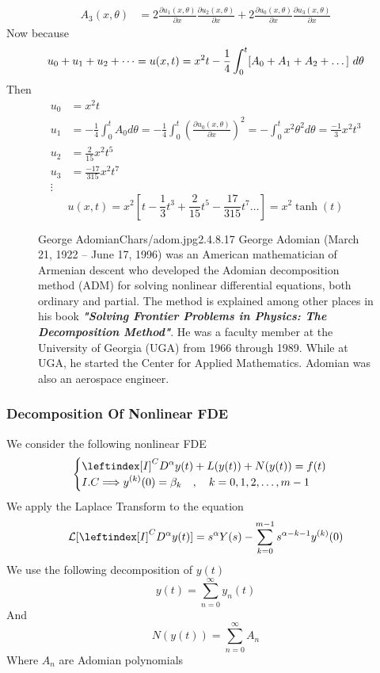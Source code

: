 \begin{example}
\begin{align*}
        A_3(x,\theta) & = 2\frac{\partial u_1(x,\theta)}{\partial x}\frac{\partial u_2(x,\theta)}{\partial x} + 2\frac{\partial u_0(x,\theta)}{\partial x} \frac{\partial u_3(x,\theta)}{\partial x}
    \end{align*}
    Now because
    \[
        u_0 + u_1 + u_2 + \dots = u(x,t) = x^2t - \frac{1}{4}\int_{0}^{t}[A_0+A_1+A_2+\dots] \,\, d\theta
    \]
    Then
    \begin{align*}
        u_0 & = x^2t
        \\
        u_1 & = -\frac{1}{4}\int_{0}^{t}A_0d\theta = -\frac{1}{4}\int_{0}^{t}\left(\frac{\partial u_0(x,\theta)}{\partial x}\right)^2 = -\int_{0}^{t} x^2 \theta^2 d\theta = \frac{-1}{3}x^2t^3
        \\
        u_2 & = \frac{2}{15} x^2t^5
        \\
        u_3 &= \frac{-17}{315} x^2t^7 
        \\
        \vdots
    \end{align*}
    \[
        u(x,t) = x^2 \left[t-\frac{1}{3}t^3 + \frac{2}{15} t^5 - \frac{17}{315} t^7 \dots\right] = x^2 \tanh(t)
    \]
\end{example}
\begin{figure}[b]
    \begin{enrichment}{George Adomian}{Chars/adom.jpg}{2.4}{.8}{.17}
        George Adomian (March 21, 1922 – June 17, 1996)
        was an American mathematician of Armenian descent
        who developed the Adomian decomposition method (ADM)
        for solving nonlinear differential equations,
        both ordinary and partial.
        The method is explained among other places
        in his book \textit{\textbf{"Solving Frontier Problems in Physics:
                The Decomposition Method"}}.
        He was a faculty member at the University of Georgia
        (UGA) from 1966 through 1989. While at UGA,
        he started the Center for Applied Mathematics.
        Adomian was also an aerospace engineer.
    \end{enrichment}
\end{figure}
\newpage
\subsubsection{Decomposition Of Nonlinear FDE}
We consider the following nonlinear FDE 
\begin{equation}
    \begin{cases}
        \displaystyle \leftindex[I]^C {D^{\alpha}} y(t) + L(y(t)) + N(y(t)) = f(t)
        \\
        I.C \Longrightarrow \displaystyle y^{(k)}(0) = \beta_k \quad,\quad k=0,1,2,\dots,m-1 
    \end{cases}
\end{equation}
We apply the Laplace Transform to the equation
\[
    \mathcal{L}[\leftindex[I]^C {D^{\alpha}} y(t)] = s^{\alpha} Y(s) - \sum_{k=0}^{m-1} s^{\alpha-k-1} y^{(k)}(0)
\]
We use the following decomposition of $y(t)$
\[
    y(t) = \sum_{n=0}^{\infty} y_n(t)
\]
And 
\[
    N(y(t)) = \sum_{n=0}^{\infty} A_n
\]
Where $A_n$ are Adomian polynomials

